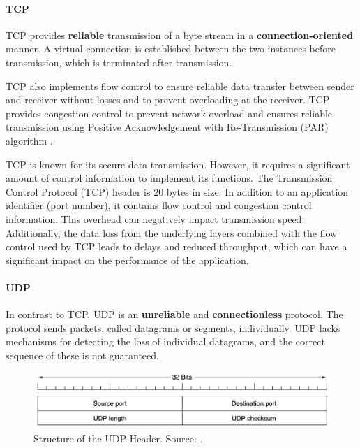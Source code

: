 \paragraph{TCP}

TCP provides \textbf{reliable} transmission of a byte stream in a \textbf{connection-oriented} manner. A virtual connection is established between the two instances before transmission, which is terminated after transmission.

TCP also implements flow control to ensure reliable data transfer between sender and receiver without losses and to prevent overloading at the receiver.  TCP provides congestion control to prevent network overload and ensures reliable transmission using Positive Acknowledgement with Re-Transmission (PAR) algorithm \cite{Holtkamp2024Transport}.  

TCP is known for its secure data transmission. However, it requires a significant amount of control information to implement its functions. The Transmission Control Protocol (TCP) header is 20 bytes in size. In addition to an application identifier (port number), it contains flow control and congestion control information. This overhead can negatively impact transmission speed. Additionally, the data loss from the underlying layers combined with the flow control used by TCP leads to delays and reduced throughput, which can have a significant impact on the performance of the application.

\paragraph{UDP}

In contrast to TCP, UDP is an \textbf{unreliable} and \textbf{connectionless} protocol. The protocol sends packets, called datagrams or segments, individually. UDP lacks mechanisms for detecting the loss of individual datagrams, and the correct sequence of these is not guaranteed.

\begin{figure}[h]
    \centering
    \includegraphics[width=1\linewidth]{figures/tcpip_refmodel/image6.png}
    \caption[Structure of the UDP Header]{Structure of the UDP Header. Source: \cite{Tanenbaum2010}.}
    \label{fig:UDPHeader}
\end{figure}

